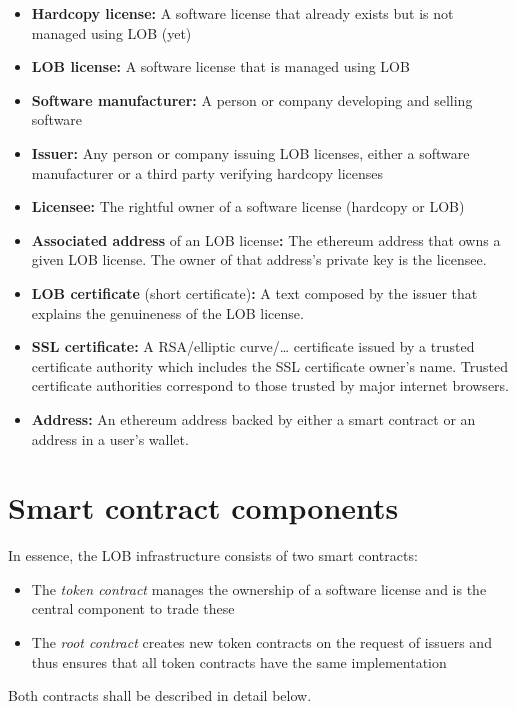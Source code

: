 \documentclass[a4paper]{article}
\begin{document}
\begin{itemize}
  \item \textbf{Hardcopy license:} A software license that already exists but is not managed using LOB (yet)
  \item \textbf{LOB license:} A software license that is managed using LOB
  \item \textbf{Software manufacturer:} A person or company developing and selling software
  \item \textbf{Issuer:} Any person or company issuing LOB licenses, either a software manufacturer or a third party verifying hardcopy licenses
  \item \textbf{Licensee:} The rightful owner of a software license (hardcopy or LOB)
  \item \textbf{Associated address} of an LOB license\textbf{:} The ethereum address that owns a given LOB license. The owner of that address's private key is the licensee.
  \item \textbf{LOB certificate} (short certificate)\textbf{:} A text composed by the issuer that explains the genuineness of the LOB license.
  \item \textbf{SSL certificate:} A RSA/elliptic curve/… certificate issued by a trusted certificate authority which includes the SSL certificate owner's name. Trusted certificate authorities correspond to those trusted by major internet browsers.
  \item \textbf{Address:} An ethereum address backed by either a smart contract or an address in a user's wallet.

\end{itemize}

\section{Smart contract components}

In essence, the LOB infrastructure consists of two smart contracts: 
\begin{itemize}
  \item The \emph{token contract} manages the ownership of a software license and is the central component to trade these
  \item The \emph{root contract} creates new token contracts on the request of issuers and thus ensures that all token contracts have the same implementation
\end{itemize}

Both contracts shall be described in detail below.
\end{document}
